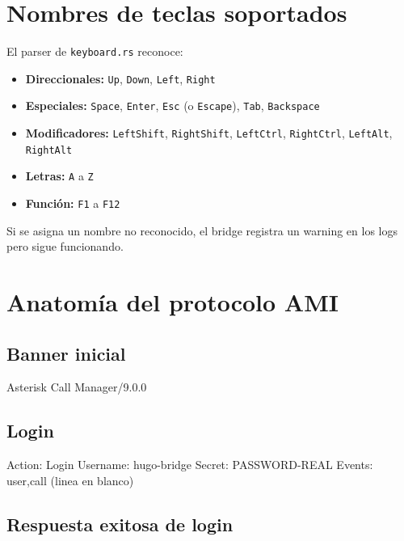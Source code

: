 \section{Nombres de teclas soportados}

El parser de \texttt{keyboard.rs} reconoce:

\begin{itemize}
  \item \textbf{Direccionales:} \texttt{Up}, \texttt{Down}, \texttt{Left}, \texttt{Right}
  \item \textbf{Especiales:} \texttt{Space}, \texttt{Enter}, \texttt{Esc} (o \texttt{Escape}), \texttt{Tab}, \texttt{Backspace}
  \item \textbf{Modificadores:} \texttt{LeftShift}, \texttt{RightShift}, \texttt{LeftCtrl}, \texttt{RightCtrl}, \texttt{LeftAlt}, \texttt{RightAlt}
  \item \textbf{Letras:} \texttt{A} a \texttt{Z}
  \item \textbf{Función:} \texttt{F1} a \texttt{F12}
\end{itemize}

Si se asigna un nombre no reconocido, el bridge registra un warning en los logs pero sigue funcionando.

\section{Anatomía del protocolo AMI}

\subsection{Banner inicial}

\begin{plaincode}
Asterisk Call Manager/9.0.0
\end{plaincode}

\subsection{Login}

\begin{plaincode}
Action: Login
Username: hugo-bridge
Secret: PASSWORD-REAL
Events: user,call
(linea en blanco)
\end{plaincode}

\subsection{Respuesta exitosa de login}

